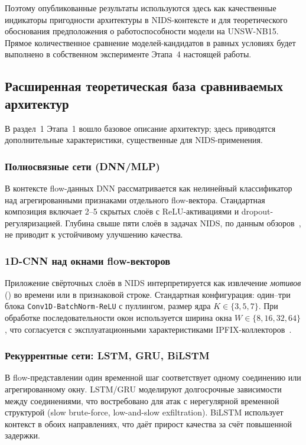 Поэтому опубликованные результаты используются здесь как качественные
индикаторы пригодности архитектуры в NIDS-контексте и для теоретического
обоснования предположения о работоспособности модели на UNSW-NB15. Прямое
количественное сравнение моделей-кандидатов в равных условиях будет
выполнено в собственном эксперименте Этапа~4 настоящей работы.

\subsection{Расширенная теоретическая база сравниваемых архитектур}

В раздел~1 Этапа~1 вошло базовое описание архитектур; здесь приводятся
дополнительные характеристики, существенные для NIDS-применения.

\subsubsection{Полносвязные сети (DNN/MLP)}

В контексте flow-данных DNN рассматривается как нелинейный классификатор
над агрегированными признаками отдельного flow-вектора. Стандартная
композиция включает 2--5 скрытых слоёв с ReLU-активациями и dropout-регуляризацией.
Глубина свыше пяти слоёв в задачах NIDS, по данным
обзоров~\cite{vinayakumar2019dl, ferrag2020dlcyber, ahmad2021nids}, не
приводит к устойчивому улучшению качества.

\subsubsection{1D-CNN над окнами flow-векторов}

Приложение свёрточных слоёв в NIDS интерпретируется как извлечение
\emph{мотивов} () во времени или в признаковой строке.
Стандартная конфигурация: один--три блока \texttt{Conv1D-BatchNorm-ReLU}
с пуллингом, размер ядра \(K \in \{3, 5, 7\}\). При обработке
последовательности окон используется ширина окна
\(W \in \{8, 16, 32, 64\}\), что согласуется с эксплуатационными
характеристиками IPFIX-коллекторов~\cite{rfc7011}.

\subsubsection{Рекуррентные сети: LSTM, GRU, BiLSTM}

В flow-представлении один временной шаг соответствует одному соединению или
агрегированному окну. LSTM/GRU моделируют долгосрочные зависимости между
соединениями, что востребовано для атак с нерегулярной временной структурой
(slow brute-force, low-and-slow exfiltration). BiLSTM использует контекст в
обоих направлениях, что даёт прирост качества за счёт повышенной задержки.

